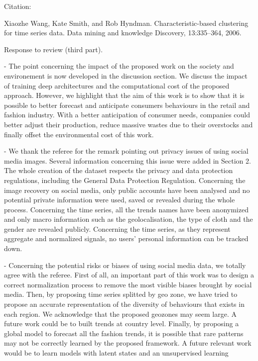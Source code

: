 \documentclass[10pt]{article} %
\begin{document}
Citation:

Xiaozhe Wang, Kate Smith, and Rob Hyndman. Characteristic-based clustering for time series data. Data mining and knowledge Discovery, 13:335–364, 2006.

Response to review (third part).\vspace{0.2cm}

- The point concerning the impact of the proposed work on the society and environement is now developed in the discussion section. We discuss the impact of training deep architectures and the computational cost of the proposed approach. However, we highlight that the aim of this work is to show that it is possible to better forecast and anticipate consumers behaviours in the retail and fashion industry. With a better anticipation of consumer needs, companies could better adjust their production, reduce massive wastes due to their overstocks and finally offset the environmental cost of this work.
	
- We thank the referee for the remark pointing out privacy issues of using social media images. Several information concerning this issue were added in Section 2. The whole creation of the dataset respects the privacy and data protection regulations, including the General Data Protection Regulation. Concerning the image recovery on social media, only public accounts have been analysed and no potential private information were used, saved or revealed during the whole process. Concerning the time series, all the trends names have been anonymized and only macro information such as the geolocalisation, the type of cloth and the gender are revealed publicly. Concerning the time series, as they represent aggregate and normalized signals, no users' personal information can be tracked down.
	
- Concerning the potential risks or biases of using social media data, we totally agree with the referee. First of all, an important part of this work was to design a correct normalization process to remove the most visible biases brought by social media. Then, by proposing time series splitted by geo zone, we have tried to propose an accurate representation of the diversity of behaviours that exists in each region. We acknowledge that the proposed geozones may seem large. A future work could be to built trends at country level. Finally, by proposing a global model to forecast all the fashion trends, it is possible that rare patterns may not be correctly learned by the proposed framework. A future relevant work would be to learn models with latent states and an unsupervised learning
\end{document}
